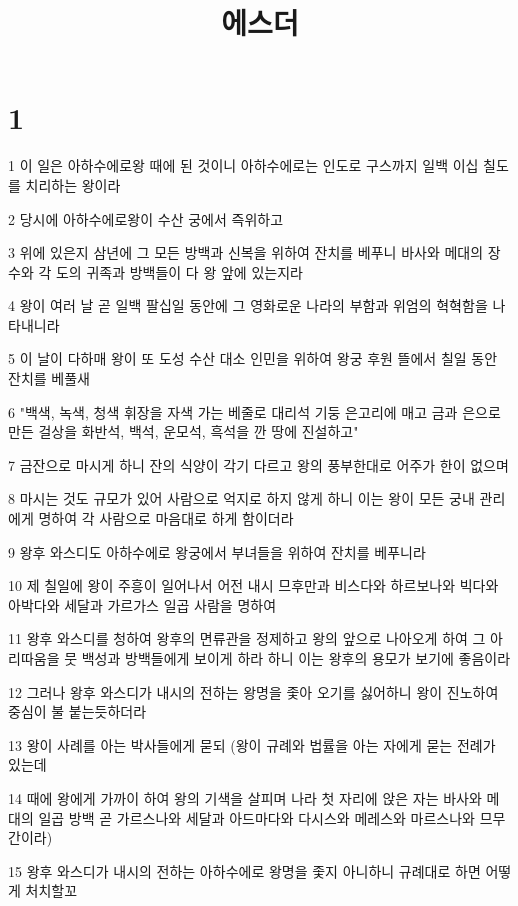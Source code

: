 

\title{에스더}


\chapter{1}

\par 1 이 일은 아하수에로왕 때에 된 것이니 아하수에로는 인도로 구스까지 일백 이십 칠도를 치리하는 왕이라
\par 2 당시에 아하수에로왕이 수산 궁에서 즉위하고
\par 3 위에 있은지 삼년에 그 모든 방백과 신복을 위하여 잔치를 베푸니 바사와 메대의 장수와 각 도의 귀족과 방백들이 다 왕 앞에 있는지라
\par 4 왕이 여러 날 곧 일백 팔십일 동안에 그 영화로운 나라의 부함과 위엄의 혁혁함을 나타내니라
\par 5 이 날이 다하매 왕이 또 도성 수산 대소 인민을 위하여 왕궁 후원 뜰에서 칠일 동안 잔치를 베풀새
\par 6 "백색, 녹색, 청색 휘장을 자색 가는 베줄로 대리석 기둥 은고리에 매고 금과 은으로 만든 걸상을 화반석, 백석, 운모석, 흑석을 깐 땅에 진설하고"
\par 7 금잔으로 마시게 하니 잔의 식양이 각기 다르고 왕의 풍부한대로 어주가 한이 없으며
\par 8 마시는 것도 규모가 있어 사람으로 억지로 하지 않게 하니 이는 왕이 모든 궁내 관리에게 명하여 각 사람으로 마음대로 하게 함이더라
\par 9 왕후 와스디도 아하수에로 왕궁에서 부녀들을 위하여 잔치를 베푸니라
\par 10 제 칠일에 왕이 주흥이 일어나서 어전 내시 므후만과 비스다와 하르보나와 빅다와 아박다와 세달과 가르가스 일곱 사람을 명하여
\par 11 왕후 와스디를 청하여 왕후의 면류관을 정제하고 왕의 앞으로 나아오게 하여 그 아리따움을 뭇 백성과 방백들에게 보이게 하라 하니 이는 왕후의 용모가 보기에 좋음이라
\par 12 그러나 왕후 와스디가 내시의 전하는 왕명을 좇아 오기를 싫어하니 왕이 진노하여 중심이 불 붙는듯하더라
\par 13 왕이 사례를 아는 박사들에게 묻되 (왕이 규례와 법률을 아는 자에게 묻는 전례가 있는데
\par 14 때에 왕에게 가까이 하여 왕의 기색을 살피며 나라 첫 자리에 앉은 자는 바사와 메대의 일곱 방백 곧 가르스나와 세달과 아드마다와 다시스와 메레스와 마르스나와 므무간이라)
\par 15 왕후 와스디가 내시의 전하는 아하수에로 왕명을 좇지 아니하니 규례대로 하면 어떻게 처치할꼬
